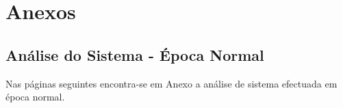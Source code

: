 \chapter*{Anexos}

\section*{Análise do Sistema - Época Normal}

Nas páginas seguintes encontra-se em Anexo a análise de sistema efectuada em época normal.

\label{pdf:analysis}
